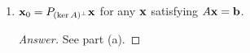\documentclass[../psets.tex]{subfiles}
\begin{document}
\begin{enumerate}[label={\textbf{4.\arabic*.}}]
\begin{enumerate}
\begin{proof}[Answer]
            \begin{equation*}
                \norm{\x}^2 = \norm{\x_0}^2+\norm{\x_h}^2 \geq \norm{\x_0}
            \end{equation*}
            so $\x_0$ is the unique minimal norm solution (any solution is of the form $\x_0+\x_h$) because any other solution with a nontrivial $\x_h$ necessarily has a greater norm.
        \end{proof}
        \item $\mathbf{x}_0=P_{(\ker A)^\perp}\mathbf{x}$ for any $\mathbf{x}$ satisfying $A\mathbf{x}=\mathbf{b}$.
        \begin{proof}[Answer]
            See part (a).
        \end{proof}
    \end{enumerate}
\end{enumerate}
\end{document}
